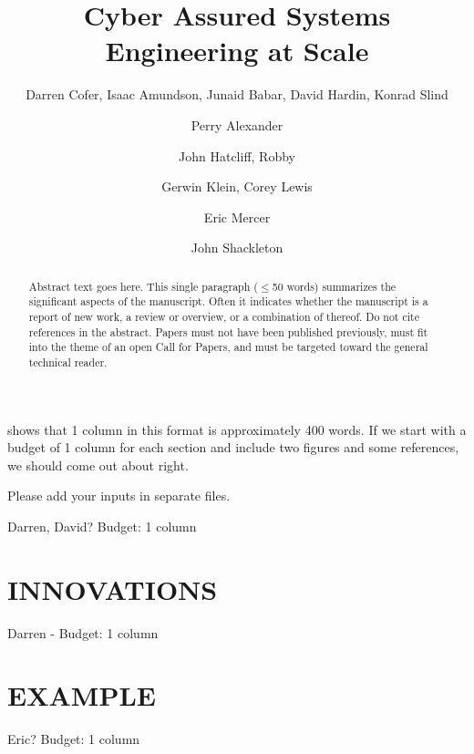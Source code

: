 \documentclass{IEEEcsmag}
\begin{document}

\title{Cyber Assured Systems Engineering at Scale}

\author{Darren Cofer, Isaac Amundson, Junaid Babar, David Hardin, Konrad Slind}

\author{Perry Alexander}

\author{John Hatcliff, Robby}

\author{Gerwin Klein, Corey Lewis}

\author{Eric Mercer}

\author{John Shackleton}


\begin{abstract}
Abstract text goes here. This single paragraph ($\le$50 words) summarizes the significant aspects of the manuscript. Often it indicates whether the manuscript is a report of new work, a review or overview, or a combination of thereof. Do not cite references in the abstract. Papers must not have been published previously, must fit into the theme of an open Call for Papers, and must be targeted toward the general technical reader. 
\end{abstract}

\maketitle


 shows that 1 column in this format is approximately 400 words.  If we start with a budget of 1 column for each section and include two figures and some references, we should come out about right.  

Please add your inputs in separate files.

Darren, David? Budget: 1 column


\section{INNOVATIONS}
Darren -  Budget: 1 column


\section{EXAMPLE}
Eric?  Budget: 1 column

\end{document}
